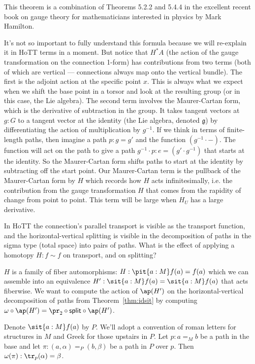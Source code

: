 This theorem is a combination of Theorems 5.2.2 and 5.4.4 in the
excellent recent book on gauge theory for mathematicians interested in
physics by Mark Hamilton\cite{hamilton2017}.

It's not so important to fully understand this formula because we will
re-explain it in HoTT terms in a moment. But notice that \(H^*A\) (the
action of the gauge transformation on the connection 1-form) has
contributions from two terms (both of which are vertical --- connections
always map onto the vertical bundle). The first is the adjoint action at
the specific point \(x\). This is always what we expect when we shift
the base point in a torsor and look at the resulting group (or in this
case, the Lie algebra). The second term involves the Maurer-Cartan form,
which is the derivative of subtraction in the group. It takes tangent
vectors at \(g:G\) to a tangent vector at the identity (the Lie algebra,
denoted \(\mathfrak{g}\)) by differentiating the action of
multiplication by \(g^{-1}\). If we think in terms of finite-length
paths, then imagine a path \(p:g=g'\) and the function
\((g^{-1}\cdot -)\). The function will act on the path to give a path
\(g^{-1}\cdot p:e=(g'\cdot g^{-1})\) that starts at the identity. So the
Maurer-Cartan form shifts paths to start at the identity by subtracting
off the start point. Our Maurer-Cartan term is the pullback of the
Maurer-Cartan form by \(H\) which records how \(H\) acts
infinitesimally, i.e. the contribution from the gauge transformation
\(H\) that comes from the rapidity of change from point to point. This
term will be large when \(H_U\) has a large derivative.

In HoTT the connection's parallel transport is visible as the transport
function, and the horizontal-vertical splitting is visible in the
decomposition of paths in the sigma type (total space) into pairs of
paths. What is the effect of applying a homotopy \(H:f\sim f\) on
transport, and on splitting?

\(H\) is a family of fiber automorphisms: \(H:\pit{a:M}f(a)=f(a)\) which
we can assemble into an equivalence \(H':\sit{a:M}f(a)=\sit{a:M}f(a)\)
that acts fiberwise. We want to compute the action of \(\ap(H')\) on the
horizontal-vertical decomposition of paths from Theorem~\ref{thm:idsit}
by computing
\(\omega\circ\ap(H')=\pr_2\circ\mathsf{split}\circ\ap(H')\).

Denote \(\sit{a:M}f(a)\) by \(P\). We'll adopt a convention of roman
letters for structures in \(M\) and Greek for those upstairs in \(P\).
Let \(p:a=_M b\) be a path in the base and let
\(\pi:(a,\alpha)=_P (b,\beta)\) be a path in \(P\) over \(p\). Then
\(\omega(\pi):\tr_p(\alpha)=\beta\).

